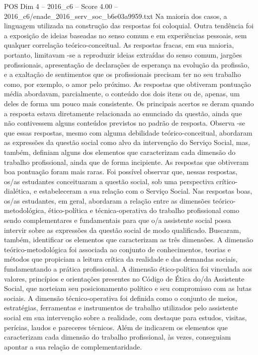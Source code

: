 \begin{textsample}{POS Dim 4 – 2016\_c6 – Score 4.00 – 2016\_c6/enade\_2016\_serv\_soc\_b6e03a9959.txt}
Na maioria dos casos, a linguagem utilizada na construção das respostas foi coloquial.
Outra tendência foi a exposição de ideias baseadas no senso comum e em experiências pessoais, sem qualquer correlação teórico-conceitual.
As respostas fracas, em sua maioria, portanto, limitavam -se a reproduzir ideias extraídas do senso comum, jargões profissionais, apresentação de declarações de esperança na evolução da profissão, e a exaltação de sentimentos que os profissionais precisam ter no seu trabalho como, por exemplo, o amor pelo próximo.
As respostas que obtiveram pontuação média abordavam, parcialmente, o conteúdo dos dois itens ou de, apenas, um deles de forma um pouco mais consistente.
Os principais acertos se deram quando a resposta estava diretamente relacionada ao enunciado da questão, ainda que não contivessem alguns conteúdos previstos no padrão de resposta.
Observa -se que essas respostas, mesmo com alguma debilidade teórico-conceitual, abordaram as expressões da questão social como alvo da intervenção do Serviço Social, mas, também, definiam alguns dos elementos que caracterizam cada dimensão do trabalho profissional, ainda que de forma incipiente.
As respostas que obtiveram boa pontuação foram mais raras.
Foi possível observar que, nessas respostas, os/as estudantes conceituaram a questão social, sob uma perspectiva crítico-dialética, e estabeleceram a sua relação com o Serviço Social.
Nas respostas boas, os/as estudantes, em geral, abordaram a relação entre as dimensões teórico-metodológica, ético-política e técnica-operativa do trabalho profissional como sendo complementares e fundamentais para que o/a assistente social possa intervir sobre as expressões da questão social de modo qualificado.
Buscaram, também, identificar os elementos que caracterizam as três dimensões.
A dimensão teórico-metodológica foi associada ao conjunto de conhecimentos, teorias e métodos que propiciam a leitura crítica da realidade e das demandas sociais, fundamentando a prática profissional.
A dimensão ético-política foi vinculada aos valores, princípios e orientações presentes no Código de Ética do/da Assistente Social, que norteiam seu posicionamento político e seu compromisso com as lutas sociais.
A dimensão técnico-operativa foi definida como o conjunto de meios, estratégias, ferramentas e instrumentos de trabalho utilizados pelo assistente social em sua intervenção sobre a realidade, com destaque para estudos, visitas, perícias, laudos e pareceres técnicos.
Além de indicarem os elementos que caracterizam cada dimensão do trabalho profissional, às vezes, conseguiam apontar a sua relação de complementaridade.

\end{textsample}
